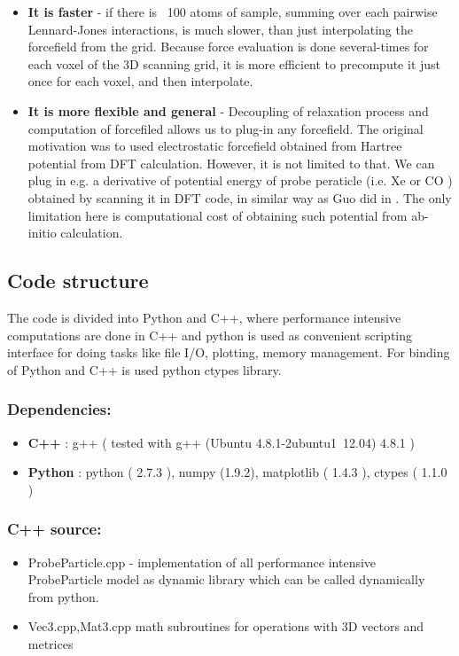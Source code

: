\begin{itemize}

    \item \textbf{It is faster} - if there is ~100 atoms of sample, summing over
    each pairwise Lennard-Jones interactions, is much slower, than just
    interpolating the forcefield from the grid. Because force evaluation is done
    several-times for each voxel of the 3D scanning grid, it is more efficient
    to precompute it just once for each voxel, and then interpolate.

    \item \textbf{It is more flexible and general} - Decoupling of relaxation
    process and computation of forcefiled allows us to plug-in any forcefield.
    The original motivation was to used electrostatic forcefield obtained from
    Hartree potential from DFT calculation. However, it is not limited to that.
    We can plug in e.g. a derivative of potential energy of probe peraticle
    (i.e. Xe or CO ) obtained by scanning it in DFT code, in similar way as Guo
    did in \cite{chshguohighresolmodel} . The only limitation here is computational cost of obtaining
    such potential from ab-initio calculation.
\end{itemize}



\subsection{Code structure}
The code is divided into Python and C++, where performance intensive
computations are done in C++ and python is used as convenient scripting
interface for doing tasks like file I/O, plotting, memory management. For
binding of Python and C++ is used python ctypes library.


\subsubsection{Dependencies:}
\begin{itemize}
    \item \textbf{C++} : g++ ( tested with g++ (Ubuntu 4.8.1-2ubuntu1~12.04) 4.8.1 )
    \item \textbf{Python} : python ( 2.7.3 ), numpy (1.9.2), matplotlib ( 1.4.3 ), ctypes
    ( 1.1.0 )
\end{itemize}

\subsubsection{C++ source:}
\begin{itemize}
    \item  ProbeParticle.cpp - implementation of all performance intensive
    ProbeParticle model as dynamic library which can be called dynamically from
    python.
    \item Vec3.cpp,Mat3.cpp math subroutines for operations with 3D vectors and
    metrices
\end{itemize}

